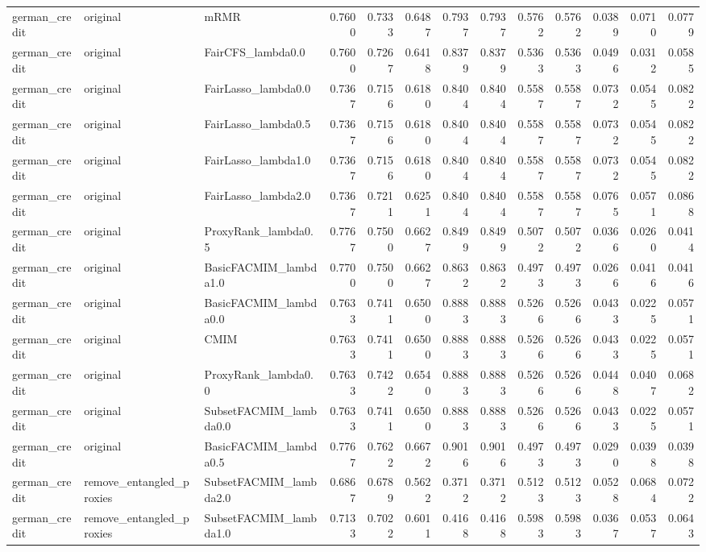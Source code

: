 \begin{tabular}{lllrrrrrrrrrr}
german_credit & original & mRMR & 0.7600 & 0.7333 & 0.6487 & 0.7937 & 0.7937 & 0.5762 & 0.5762 & 0.0389 & 0.0710 & 0.0779 \\
german_credit & original & FairCFS_lambda0.0 & 0.7600 & 0.7267 & 0.6418 & 0.8379 & 0.8379 & 0.5363 & 0.5363 & 0.0496 & 0.0312 & 0.0585 \\
german_credit & original & FairLasso_lambda0.0 & 0.7367 & 0.7156 & 0.6180 & 0.8404 & 0.8404 & 0.5587 & 0.5587 & 0.0732 & 0.0545 & 0.0822 \\
german_credit & original & FairLasso_lambda0.5 & 0.7367 & 0.7156 & 0.6180 & 0.8404 & 0.8404 & 0.5587 & 0.5587 & 0.0732 & 0.0545 & 0.0822 \\
german_credit & original & FairLasso_lambda1.0 & 0.7367 & 0.7156 & 0.6180 & 0.8404 & 0.8404 & 0.5587 & 0.5587 & 0.0732 & 0.0545 & 0.0822 \\
german_credit & original & FairLasso_lambda2.0 & 0.7367 & 0.7211 & 0.6251 & 0.8404 & 0.8404 & 0.5587 & 0.5587 & 0.0765 & 0.0571 & 0.0868 \\
german_credit & original & ProxyRank_lambda0.5 & 0.7767 & 0.7500 & 0.6627 & 0.8499 & 0.8499 & 0.5072 & 0.5072 & 0.0366 & 0.0260 & 0.0414 \\
german_credit & original & BasicFACMIM_lambda1.0 & 0.7700 & 0.7500 & 0.6627 & 0.8632 & 0.8632 & 0.4973 & 0.4973 & 0.0266 & 0.0416 & 0.0416 \\
german_credit & original & BasicFACMIM_lambda0.0 & 0.7633 & 0.7411 & 0.6500 & 0.8883 & 0.8883 & 0.5266 & 0.5266 & 0.0433 & 0.0225 & 0.0571 \\
german_credit & original & CMIM & 0.7633 & 0.7411 & 0.6500 & 0.8883 & 0.8883 & 0.5266 & 0.5266 & 0.0433 & 0.0225 & 0.0571 \\
german_credit & original & ProxyRank_lambda0.0 & 0.7633 & 0.7422 & 0.6540 & 0.8883 & 0.8883 & 0.5266 & 0.5266 & 0.0448 & 0.0407 & 0.0682 \\
german_credit & original & SubsetFACMIM_lambda0.0 & 0.7633 & 0.7411 & 0.6500 & 0.8883 & 0.8883 & 0.5266 & 0.5266 & 0.0433 & 0.0225 & 0.0571 \\
german_credit & original & BasicFACMIM_lambda0.5 & 0.7767 & 0.7622 & 0.6672 & 0.9016 & 0.9016 & 0.4973 & 0.4973 & 0.0290 & 0.0398 & 0.0398 \\
german_credit & remove_entangled_proxies & SubsetFACMIM_lambda2.0 & 0.6867 & 0.6789 & 0.5622 & 0.3712 & 0.3712 & 0.5123 & 0.5123 & 0.0528 & 0.0684 & 0.0722 \\
german_credit & remove_entangled_proxies & SubsetFACMIM_lambda1.0 & 0.7133 & 0.7022 & 0.6011 & 0.4168 & 0.4168 & 0.5983 & 0.5983 & 0.0367 & 0.0537 & 0.0643 \\

\end{tabular}
